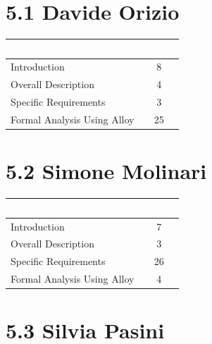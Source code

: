 \section*{5.1 \quad Davide Orizio}
\renewcommand{\arraystretch}{1.2} %

\begin{table}[h!]
    \centering
    \begin{tabular}{|l|c|}
        \hline
        \rowcolor[HTML]{5C8A99}
        \textbf{\textcolor{white}{Section}} & \textbf{\textcolor{white}{Hours}} \\ \hline
        Introduction                       & 8     \\ \hline
        Overall Description                & 4     \\ \hline
        Specific Requirements              & 3      \\ \hline
        Formal Analysis Using Alloy        & 25     \\ \hline
    \end{tabular}
\end{table}

\section*{5.2 \quad Simone Molinari}
\renewcommand{\arraystretch}{1.2} %

\begin{table}[h!]
    \centering
    \begin{tabular}{|l|c|}
        \hline
        \rowcolor[HTML]{5C8A99}
        \textbf{\textcolor{white}{Section}} & \textbf{\textcolor{white}{Hours}} \\ \hline
        Introduction                       & 7     \\ \hline
        Overall Description                & 3     \\ \hline
        Specific Requirements              & 26    \\ \hline
        Formal Analysis Using Alloy        & 4     \\ \hline
    \end{tabular}
\end{table}

\section*{5.3 \quad Silvia Pasini}
\renewcommand{\arraystretch}{1.2} %

